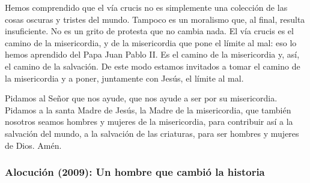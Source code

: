 \begin{body}
Hemos comprendido que el vía crucis no es simplemente una colección de las cosas oscuras y tristes del mundo. Tampoco es un moralismo que, al final, resulta insuficiente. No es un grito de protesta que no cambia nada. El vía crucis es el camino de la misericordia, y de la misericordia que pone el límite al mal: eso lo hemos aprendido del Papa Juan Pablo II. Es el camino de la misericordia y, así, el camino de la salvación. De este modo estamos invitados a tomar el camino de la misericordia y a poner, juntamente con Jesús, el límite al mal. 

Pidamos al Señor que nos ayude, que nos ayude a ser  por su misericordia. Pidamos a la santa Madre de Jesús, la Madre de la misericordia, que también nosotros seamos hombres y mujeres de la misericordia, para contribuir así a la salvación del mundo, a la salvación de las criaturas, para ser hombres y mujeres de Dios. Amén.
\end{body}


\subsubsection{Alocución (2009): Un hombre que cambió la historia}



